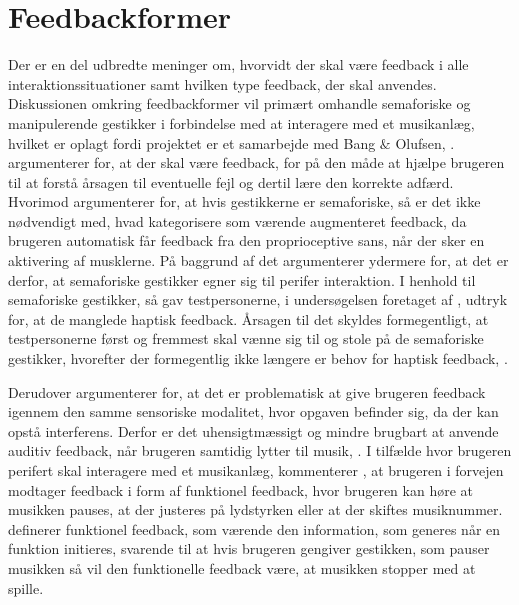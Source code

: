 \section{Feedbackformer}
\label{Feedbackformer}
%
Der er en del udbredte meninger om, hvorvidt der skal være feedback i alle interaktionssituationer samt hvilken type feedback, der skal anvendes. Diskussionen omkring feedbackformer vil primært omhandle semaforiske og manipulerende gestikker i forbindelse med at interagere med et musikanlæg, hvilket er oplagt fordi projektet er et samarbejde med Bang $\&$ Olufsen, . \blankline
%
\textcite[s. 10]{PDF:NaturalUserInterfaces} argumenterer for, at der skal være feedback, for på den måde at hjælpe brugeren til at forstå årsagen til eventuelle fejl og dertil lære den korrekte adfærd. Hvorimod \textcite[s. 16]{PDF:PIEmbeddingHCIOnTheRelevance} argumenterer for, at hvis gestikkerne er semaforiske, så er det ikke nødvendigt med, hvad \textcite[s. 16]{PDF:PIEmbeddingHCIOnTheRelevance} kategorisere som værende augmenteret feedback, da brugeren automatisk får feedback fra den proprioceptive sans, når der sker en aktivering af musklerne. På baggrund af det argumenterer \textcite[s. 16]{PDF:PIEmbeddingHCIOnTheRelevance} ydermere for, at det er derfor, at semaforiske gestikker egner sig til perifer interaktion. I henhold til semaforiske gestikker, så gav testpersonerne, i undersøgelsen foretaget af \textcite[ss. 172-173]{PDF:ComparingInputModalities}, udtryk for, at de manglede haptisk feedback. Årsagen til det skyldes formegentligt, at testpersonerne først og fremmest skal vænne sig til og stole på de semaforiske gestikker, hvorefter der formegentlig ikke længere er behov for haptisk feedback, \parencite[s. 174]{PDF:ComparingInputModalities}. 

Derudover argumenterer \textcite[s. 3]{PDF:FacilitatingPIDesignAndEvaluation} for, at det er problematisk at give brugeren feedback igennem den samme sensoriske modalitet, hvor opgaven befinder sig, da der kan opstå interferens. Derfor er det uhensigtmæssigt og mindre brugbart at anvende auditiv feedback, når brugeren samtidig lytter til musik, \parencite[s. 3]{PDF:FacilitatingPIDesignAndEvaluation}. I tilfælde hvor brugeren perifert skal interagere med et musikanlæg, kommenterer \textcite[s. 19]{PDF:PIEmbeddingHCIOnTheRelevance}, at brugeren i forvejen modtager feedback i form af funktionel feedback, hvor brugeren kan høre at musikken pauses, at der justeres på lydstyrken eller at der skiftes musiknummer. \textcite[s. 3]{PDF:InteractionFrogger} definerer funktionel feedback, som værende den information, som generes når en funktion initieres, svarende til at hvis brugeren gengiver gestikken, som pauser musikken så vil den funktionelle feedback være, at musikken stopper med at spille. 

